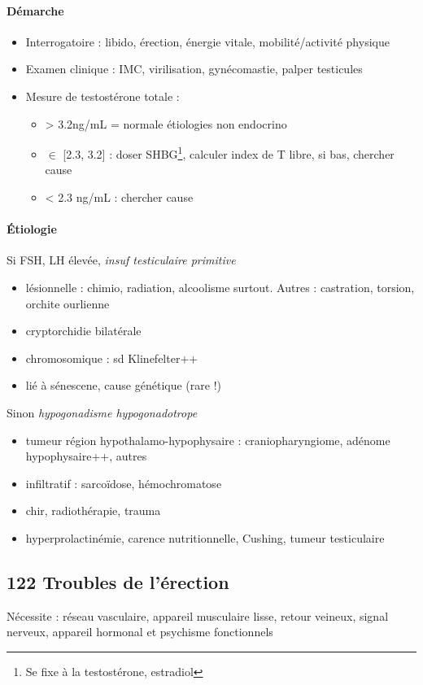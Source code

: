 \documentclass[11pt]{article}
\begin{document}
\paragraph{Démarche}
\label{sec:org88c94cd}
\begin{itemize}
\item Interrogatoire : libido, érection, énergie vitale, mobilité/activité physique
\item Examen clinique : IMC, virilisation, gynécomastie, palper testicules
\item Mesure de testostérone totale :
\begin{itemize}
\item > 3.2ng/mL = normale \thus étiologies non endocrino
\item \(\in\) [2.3, 3.2] : doser SHBG\footnote{Se fixe à la testostérone, estradiol}, calculer index de T libre, si bas, chercher cause
\item < 2.3 ng/mL : chercher cause
\end{itemize}
\end{itemize}
\paragraph{Étiologie}
\label{sec:orgdfa6748}
Si FSH, LH élevée, \emph{insuf testiculaire primitive} 
\begin{itemize}
\item lésionnelle : chimio, radiation, alcoolisme surtout. Autres : castration,
torsion, orchite ourlienne
\item cryptorchidie bilatérale
\item chromosomique : sd Klinefelter++
\item lié à sénescene, cause génétique (rare !)
\end{itemize}
Sinon \emph{hypogonadisme hypogonadotrope}
\begin{itemize}
\item tumeur région hypothalamo-hypophysaire : craniopharyngiome, adénome
hypophysaire++, autres
\item infiltratif : sarcoïdose, hémochromatose
\item chir, radiothérapie, trauma
\item hyperprolactinémie, carence nutritionnelle, Cushing, tumeur testiculaire
\end{itemize}

\subsection{122 \textdagger{} Troubles de l'érection}
\label{sec:org33260db}
Nécessite : réseau vasculaire, appareil musculaire lisse, retour veineux, signal  nerveux,
appareil hormonal et psychisme fonctionnels
\end{document}

